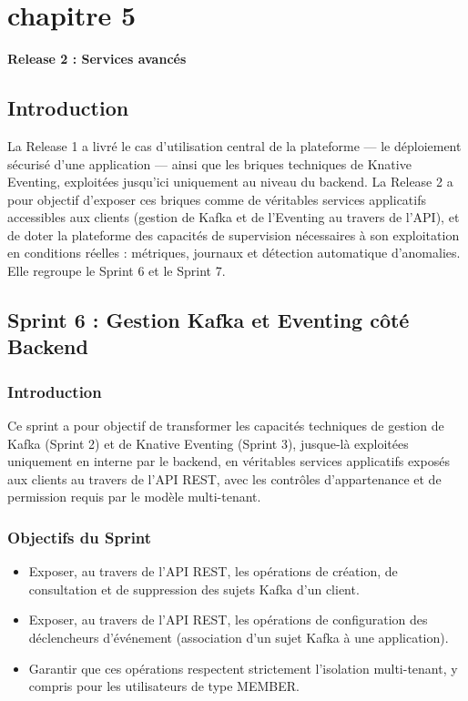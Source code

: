 \chapter*{chapitre 5}

\textbf{\Huge Release 2 : Services avancés}

\setcounter{chapter}{5}
\setcounter{section}{0}

\section{Introduction}

La Release 1 a livré le cas d'utilisation central de la plateforme — le déploiement sécurisé d'une application — ainsi que les briques techniques de Knative Eventing, exploitées jusqu'ici uniquement au niveau du backend. La Release 2 a pour objectif d'exposer ces briques comme de véritables services applicatifs accessibles aux clients (gestion de Kafka et de l'Eventing au travers de l'API), et de doter la plateforme des capacités de supervision nécessaires à son exploitation en conditions réelles : métriques, journaux et détection automatique d'anomalies. Elle regroupe le Sprint 6 et le Sprint 7.


\section{Sprint 6 : Gestion Kafka et Eventing côté Backend}

\subsection{Introduction}

Ce sprint a pour objectif de transformer les capacités techniques de gestion de Kafka (Sprint 2) et de Knative Eventing (Sprint 3), jusque-là exploitées uniquement en interne par le backend, en véritables services applicatifs exposés aux clients au travers de l'API REST, avec les contrôles d'appartenance et de permission requis par le modèle multi-tenant.

\subsection{Objectifs du Sprint}

\begin{itemize}
    \item Exposer, au travers de l'API REST, les opérations de création, de consultation et de suppression des sujets Kafka d'un client.
    \item Exposer, au travers de l'API REST, les opérations de configuration des déclencheurs d'événement (association d'un sujet Kafka à une application).
    \item Garantir que ces opérations respectent strictement l'isolation multi-tenant, y compris pour les utilisateurs de type MEMBER.
\end{itemize}

